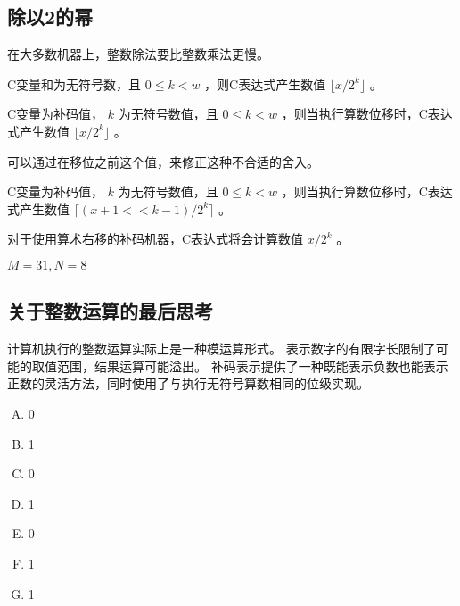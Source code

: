 {    \subsection{除以2的幂}
    {
        在大多数机器上，整数除法要比整数乘法更慢。

        \begin{defines}[除以2的幂的无符号除法]
            C变量和为无符号数，且 $0 \leq k < w$ ，则C表达式产生数值 $\lfloor x / 2^k \rfloor$ 。
        \end{defines}

        \begin{defines}
            C变量为补码值， $k$ 为无符号数值，且 $0 \leq k < w$ ，则当执行算数位移时，C表达式产生数值 $\lfloor x / 2^k \rfloor$ 。
        \end{defines}

        可以通过在移位之前这个值，来修正这种不合适的舍入。

        \begin{defines}
            C变量为补码值， $k$ 为无符号数值，且 $0 \leq k < w$ ，则当执行算数位移时，C表达式产生数值 $\lceil (x + 1 << k - 1) / 2^k \rceil$ 。
        \end{defines}

        对于使用算术右移的补码机器，C表达式将会计算数值 $x / 2^k$ 。

        \begin{practicec}

        \end{practicec}

        \begin{practicec}
            $M = 31, N = 8$
        \end{practicec}
    }

    \subsection{关于整数运算的最后思考}
    {
        计算机执行的整数运算实际上是一种模运算形式。
        表示数字的有限字长限制了可能的取值范围，结果运算可能溢出。
        补码表示提供了一种既能表示负数也能表示正数的灵活方法，同时使用了与执行无符号算数相同的位级实现。

        \begin{practicec}
            \begin{enumerate}[A.]
                \item 0
                \item 1
                \item 0
                \item 1
                \item 0
                \item 1
                \item 1
            \end{enumerate}
        \end{practicec}
    }
}
